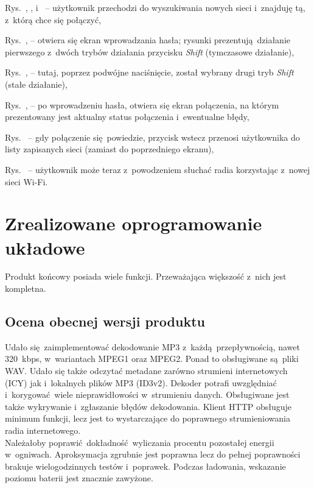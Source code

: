 \documentclass[polish]{aghengthesis}
\let\tempone\itemize
\let\temptwo\enditemize
\renewenvironment{itemize}{\tempone\setlength{\itemsep}{0cm}}{\temptwo}
\begin{document}
			\begin{itemize}
				\item Rys.~, ,  i~ -- użytkownik przechodzi do wyszukiwania nowych sieci i~znajduję tą, z~którą chce się połączyć,
				\item Rys.~,  -- otwiera się ekran wprowadzania hasła; rysunki prezentują działanie pierwszego z~dwóch trybów działania przycisku \textit{Shift} (tymczasowe działanie),
				\item Rys.~,  -- tutaj, poprzez podwójne naciśnięcie, został wybrany drugi tryb \textit{Shift} (stałe działanie),
				\item Rys.~,  -- po wprowadzeniu hasła, otwiera się ekran połączenia, na którym prezentowany jest aktualny status połączenia i~ewentualne błędy,
				\item Rys.~ -- gdy połączenie się powiedzie, przycisk wstecz przenosi użytkownika do listy zapisanych sieci (zamiast do poprzedniego ekranu),
				\item Rys.~ -- użytkownik może teraz z~powodzeniem słuchać radia korzystając z~nowej sieci Wi-Fi.
			\end{itemize}
			
	\section{Zrealizowane oprogramowanie układowe}
		Produkt końcowy posiada wiele funkcji. Przeważająca większość z~nich jest kompletna.
		
		\subsection{Ocena obecnej wersji produktu}
			Udało się zaimplementować dekodowanie MP3 z~każdą przepływnością, nawet 320~kbps, w~wariantach MPEG1 oraz MPEG2. Ponad to obsługiwane są pliki WAV. Udało się także odczytać metadane zarówno strumieni internetowych (ICY) jak i~lokalnych plików MP3 (ID3v2). Dekoder potrafi uwzględniać i~korygować wiele nieprawidłowości w~strumieniu danych. Obsługiwane jest także wykrywanie i~zgłaszanie błędów dekodowania. Klient HTTP obsługuje minimum funkcji, lecz jest to wystarczające do poprawnego strumieniowania radia internetowego.
			$ $\\
			
			Należałoby poprawić dokładność wyliczania procentu pozostałej energii w~ogniwach. Aproksymacja zgrubnie jest poprawna lecz do pełnej poprawności brakuje wielogodzinnych testów i~poprawek. Podczas ładowania, wskazanie poziomu baterii jest znacznie zawyżone.
			$ $\\
			
\end{document}
